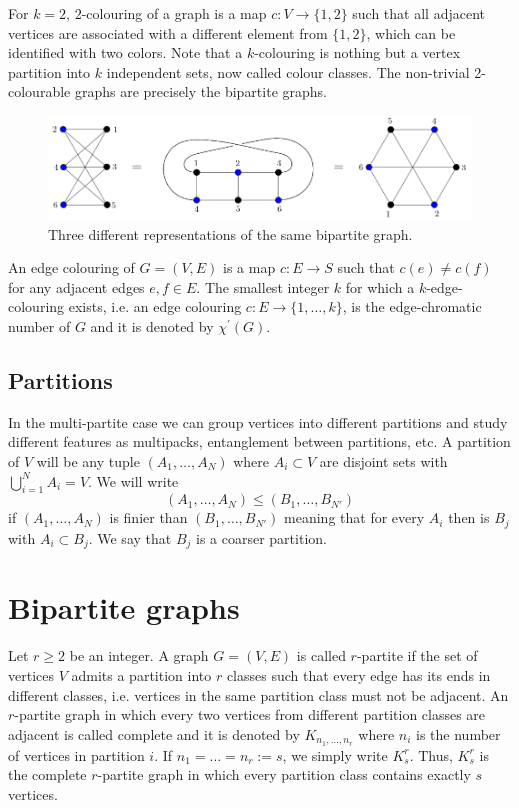 \documentclass[10pt,a4paper]{book}
\numberwithin{equation}{chapter}
\numberwithin{figure}{chapter}
\numberwithin{table}{chapter}
\begin{document}
For $k=2$, $2$-colouring of a graph is a map $c:V \rightarrow \lbrace 1,2 \rbrace$ such that all adjacent vertices are associated with a different element from $\lbrace 1,2 \rbrace$, which can be identified with two colors. Note that a $k$-colouring is nothing but a vertex partition into $k$ independent sets, now called colour classes. The non-trivial 2-colourable graphs are precisely the bipartite graphs.
\begin{figure}[H]
    \begin{center}
        \includegraphics[scale=0.5]{Imagen4.png}
    \end{center}
    \caption{\footnotesize Three different representations of the same bipartite graph.}
    \label{fig4}
\end{figure}

An edge colouring of $G = (V,E)$ is a map $c: E\rightarrow S$ such that $c(e)\neq c(f)$ for any adjacent edges $e,f \in E$. The smallest integer $k$ for which a $k$-edge-colouring exists, i.e. an edge colouring $c: E\rightarrow \lbrace 1,\ldots , k\rbrace$, is the edge-chromatic number of $G$ and it is denoted by $\chi^{'}(G)$.

\subsection{Partitions}
In the multi-partite case we can group vertices into different partitions and study different features as multipacks, entanglement between partitions, etc. A partition of $V$ will be any tuple $(A_{1},\ldots ,A_{N})$ where $A_{i}\subset V$ are disjoint sets with $\bigcup^{N}_{i=1} A_{i}=V$. We will write 
\begin{equation}
\left( A_{1},\ldots ,A_{N}\right) \leqslant \left( B_{1},\ldots ,B_{N'}\right)
\end{equation}
if $\left( A_{1},\ldots ,A_{N}\right)$ is finier than $\left( B_{1},\ldots ,B_{N'}\right)$ meaning that for every $A_i$ then is $B_j$ with $A_{i}\subset B_{j}$. We say that $B_j$ is a coarser partition.

\section{Bipartite graphs}
Let $r\geq 2$ be an integer. A graph $G=(V,E)$ is called $r$-partite if the set of vertices $V$ admits a partition into $r$ classes such that every edge has its ends in different classes, i.e. vertices in the same partition class must not be adjacent. An $r$-partite graph in which every two vertices from different partition classes are adjacent is called complete and it is denoted by $K_{n_{1},\ldots ,n_{r}}$ where $n_i$ is the number of vertices in partition $i$. If $n_{1}=\ldots =n_{r}:=s$, we simply write $K^{r}_{s}$. Thus, $K^{r}_{s}$ is the complete $r$-partite graph in which every partition class contains exactly $s$ vertices.
\end{document}

